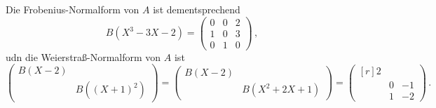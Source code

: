 Die Frobenius-Normalform von $A$ ist dementsprechend
\[
    B\left( X^3 - 3X - 2 \right)
  = \begin{pmatrix}
      0 & 0 & 2 \\
      1 & 0 & 3 \\
      0 & 1 & 0
    \end{pmatrix} \,,
\]
udn die Weierstraß-Normalform von $A$ ist
\[
    \begin{pmatrix}
      B(X-2)  &                         \\
              & B\left( (X+1)^2 \right)
    \end{pmatrix}
  = \begin{pmatrix}
      B(X-2)  &                         \\
              & B\left( X^2 + 2X + 1 \right)
    \end{pmatrix}
  = \begin{pmatrix*}[r]
      2 &   &     \\
        & 0 & -1  \\
        & 1 & -2
    \end{pmatrix*} \,.
\]





